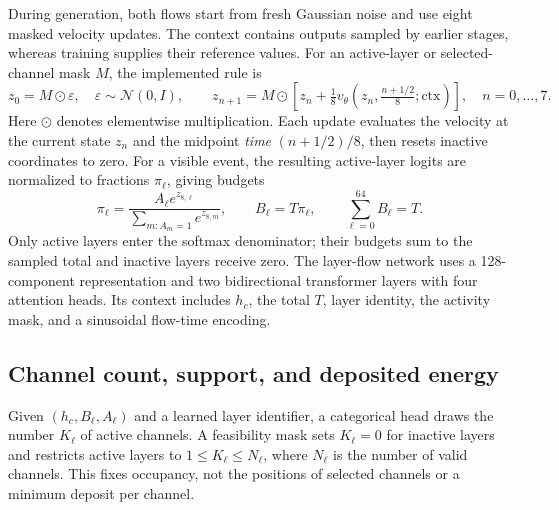 \documentclass[11pt]{article}
\begin{document}
During generation, both flows start from fresh Gaussian noise and use eight masked velocity updates. The context contains outputs sampled by earlier stages, whereas training supplies their reference values. For an active-layer or selected-channel mask $M$, the implemented rule is
\begin{equation}
 z_0=M\odot\varepsilon,\quad \varepsilon\sim\mathcal N(0,I),\qquad
 z_{n+1}=M\odot\left[z_n+\tfrac18
 v_\theta\!\left(z_n,\tfrac{n+1/2}{8};\mathrm{ctx}\right)\right],
 \quad n=0,\ldots,7.
 \label{eq:flow_steps}
\end{equation}
Here $\odot$ denotes elementwise multiplication. Each update evaluates the velocity at the current state $z_n$ and the midpoint \emph{time} $(n+1/2)/8$, then resets inactive coordinates to zero. For a visible event, the resulting active-layer logits are normalized to fractions $\pi_\ell$, giving budgets
\begin{equation}
 \pi_\ell=\frac{A_\ell e^{z_{8,\ell}}}
 {\sum_{m:A_m=1}e^{z_{8,m}}},\qquad
 B_\ell=T\pi_\ell,\qquad \sum_{\ell=0}^{64}B_\ell=T.
 \label{eq:layer_budget}
\end{equation}
Only active layers enter the softmax denominator; their budgets sum to the sampled total and inactive layers receive zero. The layer-flow network uses a 128-component representation and two bidirectional transformer layers with four attention heads. Its context includes $h_c$, the total $T$, layer identity, the activity mask, and a sinusoidal flow-time encoding.

\subsection{Channel count, support, and deposited energy}

Given $(h_c,B_\ell,A_\ell)$ and a learned layer identifier, a categorical head draws the number $K_\ell$ of active channels. A feasibility mask sets $K_\ell=0$ for inactive layers and restricts active layers to $1\leq K_\ell\leq N_\ell$, where $N_\ell$ is the number of valid channels. This fixes occupancy, not the positions of selected channels or a minimum deposit per channel.
\end{document}
